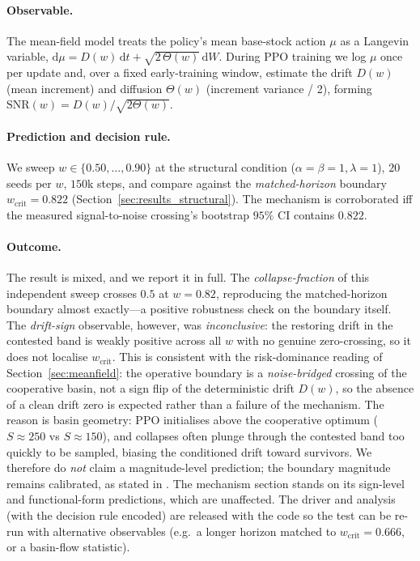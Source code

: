 \documentclass[letterpaper]{article}
\theoremstyle{plain}
\newcommand{\wcrit}{w_{\mathrm{crit}}}
\begin{document}
\paragraph{Observable.} The mean-field model treats the policy's mean
base-stock action $\mu$ as a Langevin variable,
$\mathrm{d}\mu = D(w)\,\mathrm{d}t + \sqrt{2\,\Theta(w)}\,\mathrm{d}W$. During
PPO training we log $\mu$ once per update and, over a fixed early-training
window, estimate the drift $D(w)$ (mean increment) and diffusion $\Theta(w)$
(increment variance / 2), forming $\mathrm{SNR}(w)=D(w)/\sqrt{2\Theta(w)}$.

\paragraph{Prediction and decision rule.} We sweep
$w\in\{0.50,\dots,0.90\}$ at the structural condition
($\alpha{=}\beta{=}1,\lambda{=}1$), $20$ seeds per $w$, $150$k steps, and
compare against the \emph{matched-horizon} boundary $\wcrit=0.822$
(Section~\ref{sec:results_structural}). The mechanism is corroborated iff the
measured signal-to-noise crossing's bootstrap $95\%$ CI contains $0.822$.

\paragraph{Outcome.} The result is mixed, and we report it in full. The
\emph{collapse-fraction} of this independent sweep crosses $0.5$ at
$w=0.82$, reproducing the matched-horizon boundary almost exactly---a
positive robustness check on the boundary itself. The \emph{drift-sign}
observable, however, was \emph{inconclusive}: the restoring drift in the
contested band is weakly positive across all $w$ with no genuine
zero-crossing, so it does not localise $\wcrit$. This is consistent with the
risk-dominance reading of Section~\ref{sec:meanfield}: the operative boundary is
a \emph{noise-bridged} crossing of the cooperative basin, not a sign flip of the
deterministic drift $D(w)$, so the absence of a clean drift zero is expected
rather than a failure of the mechanism. The reason is basin
geometry: PPO initialises above the cooperative optimum ($S{\approx}250$ vs
$S{\approx}150$), and collapses often plunge through the contested band too
quickly to be sampled, biasing the conditioned drift toward survivors. We
therefore do \emph{not} claim a magnitude-level prediction; the boundary
magnitude remains calibrated, as stated in . The mechanism
section stands on its sign-level and functional-form predictions, which are
unaffected. The driver and analysis (with the decision rule encoded) are
released with the code so the test can be re-run with alternative
observables (e.g.\ a longer horizon matched to $\wcrit=0.666$, or a
basin-flow statistic).
\end{document}
